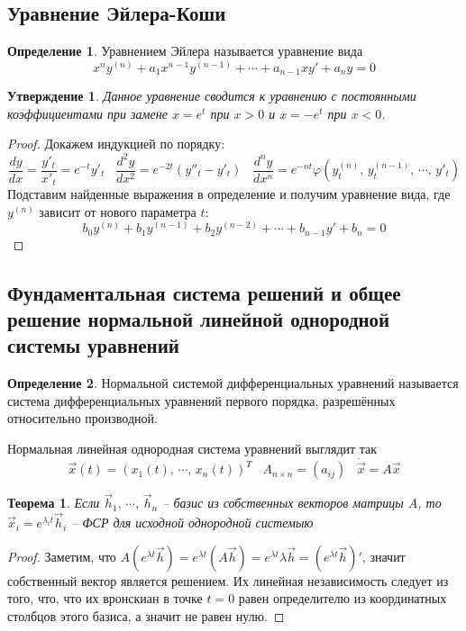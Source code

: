 \documentclass[a4paper,12pt]{article}
\renewcommand{\phi}{\ensuremath{\varphi}}
\theoremstyle{plain}
\newtheorem{theorem}{Теорема}[section]
\newtheorem{proposition}{Утверждение}[section]
\theoremstyle{definition}
\newtheorem{definition}{Определение}[section]
\theoremstyle{remark}
\begin{document}
\subsection{Уравнение Эйлера-Коши}
\begin{definition}
	Уравнением Эйлера называется уравнение вида
	\[x^ny^{(n)} + a_1x^{n-1}y^{(n-1)} + \cdots + a_{n-1}xy' + a_ny = 0\]
\end{definition}

\begin{proposition}
	Данное уравнение сводится к уравнению с постоянными коэффициентами при замене $x = e^t$ при $x > 0$ и $x = -e^t$ при $x < 0$.
\end{proposition}

\begin{proof}
	Докажем индукцией по порядку:
	\[\frac{dy}{dx} = \frac{y'_t}{x'_t} = e^{-t}y'_t \;\;\; \frac{d^2y}{dx^2} = e^{-2t}(y''_t - y'_t)\;\;\; \frac{d^ny}{dx^n} = e^{-nt}\phi(y^{(n)}_t,\,y^{(n-1)}_t,\,\cdots,\,y'_t)\]
	Подставим найденные выражения в определение и получим уравнение вида, где $y^{(n)}$ зависит от нового параметра $t$:
	\[b_0y^{(n)} + b_1y^{(n-1)} + b_2y^{(n-2)} + \cdots + b_{n-1}y' + b_n = 0\]
\end{proof}

\subsection{Фундаментальная система решений и общее решение нормальной линейной однородной системы уравнений}
\begin{definition}
	Нормальной системой дифференциальных уравнений называется система дифференциальных уравнений первого порядка, разрешённых относительно производной.

	Нормальная линейная однородная система уравнений выглядит так
	\[\vec{x}(t) = (x_1(t),\,\cdots,\,x_n(t))^T\;\;\; A_{n \times n} = (a_{ij}) \;\;\; \dot{\vec{x}} = A\vec{x}\]
\end{definition}

\begin{theorem}
	Если $\vec{h}_1,\,\cdots,\,\vec{h}_n$ -- базис из собственных векторов матрицы $A$, то $\vec{x}_i = e^{\lambda_i t}\vec{h}_i$ -- ФСР для исходной однородной системыю
\end{theorem}

\begin{proof}
	Заметим, что $A(e^{\lambda t}\vec{h}) = e^{\lambda t}(A\vec{h}) = e^{\lambda t}\lambda\vec{h} = (e^{\lambda t}\vec{h})'$, значит собственный вектор является решением. Их линейная независимость следует из того, что, что их вронскиан в точке $t = 0$ равен определителю из координатных столбцов этого базиса, а значит не равен нулю.
\end{proof}
\end{document}
